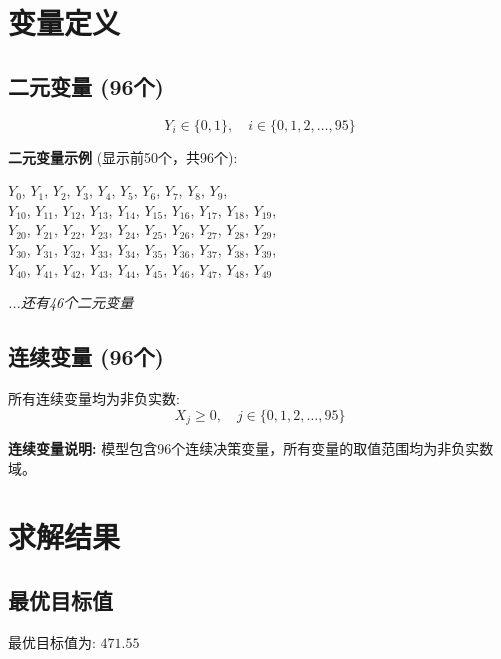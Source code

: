 \documentclass[a4paper,10pt]{article}
\begin{document}
\section{变量定义}

\subsection{二元变量 (96个)}

\begin{equation}
Y_i \in \{0,1\}, \quad i \in \{0, 1, 2, \ldots, 95\}
\end{equation}

\textbf{二元变量示例} (显示前50个，共96个):

{\small
$Y_{0}$, $Y_{1}$, $Y_{2}$, $Y_{3}$, $Y_{4}$, $Y_{5}$, $Y_{6}$, $Y_{7}$, $Y_{8}$, $Y_{9}$, \\
$Y_{10}$, $Y_{11}$, $Y_{12}$, $Y_{13}$, $Y_{14}$, $Y_{15}$, $Y_{16}$, $Y_{17}$, $Y_{18}$, $Y_{19}$, \\
$Y_{20}$, $Y_{21}$, $Y_{22}$, $Y_{23}$, $Y_{24}$, $Y_{25}$, $Y_{26}$, $Y_{27}$, $Y_{28}$, $Y_{29}$, \\
$Y_{30}$, $Y_{31}$, $Y_{32}$, $Y_{33}$, $Y_{34}$, $Y_{35}$, $Y_{36}$, $Y_{37}$, $Y_{38}$, $Y_{39}$, \\
$Y_{40}$, $Y_{41}$, $Y_{42}$, $Y_{43}$, $Y_{44}$, $Y_{45}$, $Y_{46}$, $Y_{47}$, $Y_{48}$, $Y_{49}$

\textit{...还有46个二元变量}
}

\subsection{连续变量 (96个)}

所有连续变量均为非负实数:
\begin{equation}
X_j \geq 0, \quad j \in \{0, 1, 2, \ldots, 95\}
\end{equation}

\textbf{连续变量说明:} 模型包含96个连续决策变量，所有变量的取值范围均为非负实数域。

\section{求解结果}

\subsection{最优目标值}

最优目标值为: $\mathbf{471.55}$
\end{document}
